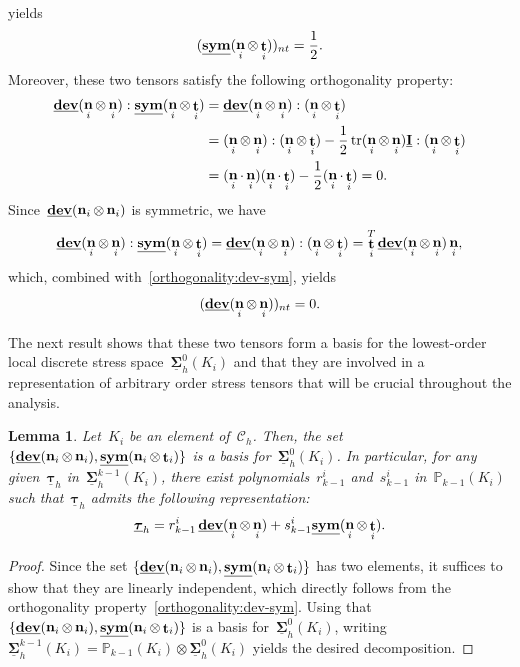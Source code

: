 \documentclass[a4paper,twoside,10pt]{article}
\theoremstyle{plain}
\newtheorem{lemma}[theorem]{Lemma}
\theoremstyle{remark}
\theoremstyle{definition}
\numberwithin{equation}{section}
\numberwithin{figure}{section}
\newcommand{\Pbbkmo}{\mathbb{P}_{k-1}}
\newcommand{\Ccalh}{\mathcal{C}_h}
\newcommand{\K}{K}
\newcommand{\Sigmah}{\underline{\boldsymbol{\Sigma}}_h}
\newcommand{\Sigmahz}{\Sigmah^0}
\newcommand{\Sigmahkmo}{\Sigmah^{k-1}}
\newcommand{\taubfh}{\underline{\boldsymbol{\tau}}_h}
\DeclareMathOperator{\dev}{\underline{\mathbf{dev}}}
\DeclareMathOperator{\tr}{tr}
\newcommand{\normtang}{{nt}}
\newcommand{\sym}{\underline{\bf{sym}}}
\DeclareMathOperator{\norm}{\bf{n}}
\DeclareMathOperator{\tang}{\bf{t}}
\newcommand{\rkmoi}{r_{k-1}^i}
\newcommand{\skmoi}{s_{k-1}^i}
\newcommand{\Ki}{{\K_i}}
\newcommand{\normi}{\norm_i}
\newcommand{\tangi}{\tang_i}
\newcommand{\Idbf}{\underline{\mathbf{I}}}
\begin{document}
yields 
\begin{equation*} \label{nt-component-sym}
    (\sym(\normi\otimes\tangi))_{\normtang} = \frac12.
\end{equation*}
Moreover,
these two tensors satisfy the following orthogonality property:
\begin{equation} \label{orthogonality:dev-sym}
\begin{split}
\dev(\normi\otimes\normi) : \sym(\normi\otimes\tangi)
&= \dev(\normi\otimes\normi) : (\normi\otimes\tangi) \\
&= (\normi\otimes\normi) : (\normi\otimes\tangi)
    - \frac{1}{2}\tr(\normi\otimes\normi)\Idbf:(\normi\otimes\tangi) \\
&= (\normi\cdot\normi)(\normi\cdot \tangi) - \frac{1}{2}(\normi\cdot \tangi)
= 0.
\end{split}
\end{equation}
Since~$\dev(\normi\otimes\normi)$ is symmetric,
we have
\begin{equation*}
\dev(\normi\otimes\normi) : \sym(\normi\otimes\tangi)
= \dev(\normi\otimes\normi) : (\normi\otimes\tangi)
= \tangi^T \dev(\normi\otimes\normi) \normi,
\end{equation*}
which,
combined with~\eqref{orthogonality:dev-sym},
yields
\begin{equation*} \label{nt-component-dev}
(\dev(\normi\otimes\normi))_{\normtang} = 0.
\end{equation*}

The next result shows that these two tensors
form a basis for the lowest-order local discrete stress space~$\Sigmahz(\Ki)$
and
that they are involved in a representation of arbitrary order stress tensors
that will be crucial throughout the analysis.
\begin{lemma} \label{lemma:dev-sym-basis-Ki}
Let~$\Ki$ be an element of~$\Ccalh$.
Then,
the set $\{\dev(\normi\otimes\normi),\sym(\normi\otimes\tangi)\}$
is a basis for~$\Sigmahz(\Ki)$.
In particular,
for any given~$\taubfh$ in~$\Sigmahkmo(\Ki)$,
there exist polynomials~$\rkmoi$ and~$\skmoi$ in~$\Pbbkmo(\Ki)$
such that~$\taubfh$ admits the following representation:
\begin{equation*}
\taubfh = \rkmoi\dev(\normi\otimes\normi) + \skmoi\sym(\normi\otimes\tangi).
\end{equation*}
\end{lemma}
\begin{proof}
Since the set $\{\dev(\normi\otimes\normi),\sym(\normi\otimes\tangi)\}$
has two elements,
it suffices to show that they are linearly independent,
which directly follows from
the orthogonality property~\eqref{orthogonality:dev-sym}.
Using that
$\{\dev(\normi\otimes\normi),\sym(\normi\otimes\tangi)\}$
is a basis for~$\Sigmahz(\Ki)$,
writing
$\Sigmahkmo(\Ki) = \Pbbkmo(\Ki)\otimes\Sigmahz(\Ki)$
yields the desired decomposition.
\end{proof}
\end{document}
